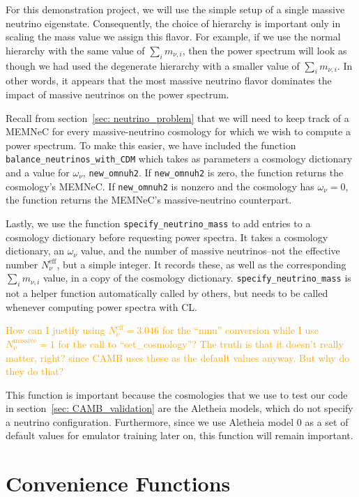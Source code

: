 For this demonstration project, we will use the simple setup of a single
massive neutrino eigenstate. Consequently, the choice of hierarchy is 
important
only in scaling the mass value we assign this flavor. For example, if we use
the normal hierarchy with the same value of $\sum_i m_{\nu, i}$, then the
power spectrum will look as though we had used the degenerate hierarchy with
a smaller value of $\sum_i m_{\nu, i}$. In other words, it appears that the
most massive neutrino flavor dominates the impact of massive neutrinos on the
power spectrum.

Recall from section~\ref{sec: neutrino_problem} that we will need to keep
track of a MEMNeC for every massive-neutrino cosmology for which we wish to
compute a power spectrum. To make this easier, we have included the function
\verb|balance_neutrinos_with_CDM| which takes as parameters a cosmology
dictionary and a value for $\omega_\nu$, \verb|new_omnuh2|. If
\verb|new_omnuh2| is zero, the function returns the cosmology's MEMNeC.
If \verb|new_omnuh2| is nonzero and the cosmology has $\omega_\nu = 0$, 
the function returns the MEMNeC's massive-neutrino counterpart.

Lastly, we use the function \verb|specify_neutrino_mass| to add entries to
a cosmology dictionary before requesting power spectra.
It takes a cosmology dictionary, an $\omega_\nu$ value, and the number of
massive neutrinos--not the effective number $N_\nu^\text{eff}$, but a simple 
integer. It records these, as well as the corresponding
$\sum_i m_{\nu, i}$ value, in a copy of the cosmology
dictionary. \verb|specify_neutrino_mass| is not a helper function 
automatically called by others, but needs to be called whenever computing
power spectra with CL.

\textcolor{orange}{How can I justify using $N_\nu^\text{eff} = 3.046$ for the
``mnu'' conversion while I use $N_\nu^\text{massive} = 1$ for the call to
``set\_cosmology''? The truth is that it doesn't really matter, right? since
CAMB uses these as the default values anyway. But why do they do that?}

This function is important because the cosmologies that we use to test our
code in section~\ref{sec: CAMB_validation} are the Aletheia models,
which do not specify a neutrino configuration. Furthermore, since we use 
Aletheia model 0 as a set of default values for emulator training later on,
this function will remain important.

\section{Convenience Functions}

